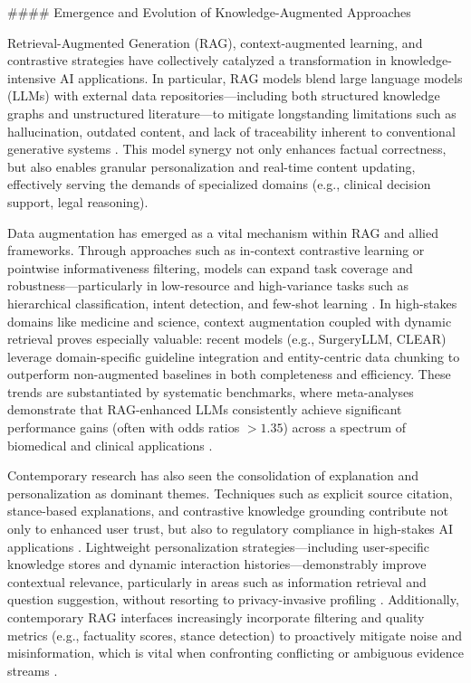 \documentclass[11pt]{article}
\begin{document}
#### Emergence and Evolution of Knowledge-Augmented Approaches

Retrieval-Augmented Generation (RAG), context-augmented learning, and contrastive strategies have collectively catalyzed a transformation in knowledge-intensive AI applications. In particular, RAG models blend large language models (LLMs) with external data repositories—including both structured knowledge graphs and unstructured literature—to mitigate longstanding limitations such as hallucination, outdated content, and lack of traceability inherent to conventional generative systems \cite{ref4,ref14,ref15,ref28,ref36,ref54,ref61,ref62,ref63,ref64}. This model synergy not only enhances factual correctness, but also enables granular personalization and real-time content updating, effectively serving the demands of specialized domains (e.g., clinical decision support, legal reasoning).

Data augmentation has emerged as a vital mechanism within RAG and allied frameworks. Through approaches such as in-context contrastive learning or pointwise informativeness filtering, models can expand task coverage and robustness—particularly in low-resource and high-variance tasks such as hierarchical classification, intent detection, and few-shot learning \cite{ref8,ref10,ref16,ref19,ref26,ref29,ref35,ref47,ref55,ref63}. In high-stakes domains like medicine and science, context augmentation coupled with dynamic retrieval proves especially valuable: recent models (e.g., SurgeryLLM, CLEAR) leverage domain-specific guideline integration and entity-centric data chunking to outperform non-augmented baselines in both completeness and efficiency. These trends are substantiated by systematic benchmarks, where meta-analyses demonstrate that RAG-enhanced LLMs consistently achieve significant performance gains (often with odds ratios $>1.35$) across a spectrum of biomedical and clinical applications \cite{ref8}.

Contemporary research has also seen the consolidation of explanation and personalization as dominant themes. Techniques such as explicit source citation, stance-based explanations, and contrastive knowledge grounding contribute not only to enhanced user trust, but also to regulatory compliance in high-stakes AI applications \cite{ref17,ref43,ref46,ref54,ref62}. Lightweight personalization strategies—including user-specific knowledge stores and dynamic interaction histories—demonstrably improve contextual relevance, particularly in areas such as information retrieval and question suggestion, without resorting to privacy-invasive profiling \cite{ref23,ref45,ref48}. Additionally, contemporary RAG interfaces increasingly incorporate filtering and quality metrics (e.g., factuality scores, stance detection) to proactively mitigate noise and misinformation, which is vital when confronting conflicting or ambiguous evidence streams \cite{ref21,ref22,ref28,ref32,ref42,ref46,ref50,ref52}.
\end{document}
